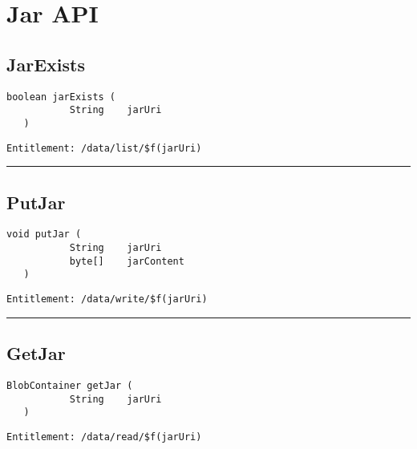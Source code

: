 \chapter{Jar API}

\section{JarExists}
\label{Api:JarExists}
\begin{lstlisting}[style=nonumbers]
   boolean jarExists (
           String    jarUri
   )
\end{lstlisting}
\begin{Verbatim}[formatcom=\color{Maroon}]
  Entitlement: /data/list/$f(jarUri)
\end{Verbatim}



\rule{12cm}{2pt}
\section{PutJar}
\label{Api:PutJar}
\begin{lstlisting}[style=nonumbers]
   void putJar (
           String    jarUri
           byte[]    jarContent
   )
\end{lstlisting}
\begin{Verbatim}[formatcom=\color{Maroon}]
  Entitlement: /data/write/$f(jarUri)
\end{Verbatim}



\rule{12cm}{2pt}
\section{GetJar}
\label{Api:GetJar}
\begin{lstlisting}[style=nonumbers]
   BlobContainer getJar (
           String    jarUri
   )
\end{lstlisting}
\begin{Verbatim}[formatcom=\color{Maroon}]
  Entitlement: /data/read/$f(jarUri)
\end{Verbatim}



